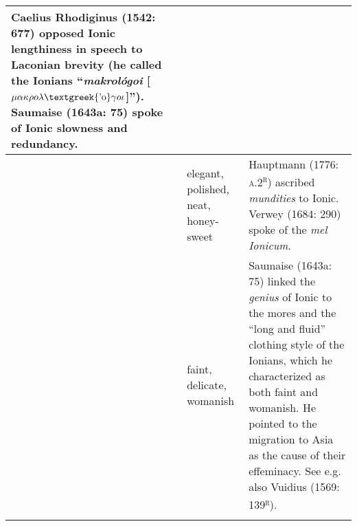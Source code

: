 \begin{flushleft}
\begin{supertabular}{m{0.5976598in}|m{1.4962599in}|m{3.9233599in}|}
Caelius Rhodiginus (1542: 677) opposed Ionic lengthiness in speech to Laconian brevity (he called the Ionians “\textit{makrológoi} [$\mu \alpha \kappa \rho o\lambda \text{\textgreek{'o}}\gamma o\iota $]”). Saumaise (1643a: 75) spoke of Ionic slowness and redundancy.\\\hline
 &
elegant, polished, neat, honey-sweet &
Hauptmann (1776: \textsc{a.2}\textsc{\textsuperscript{r}}) ascribed \textit{mundities} to Ionic. Verwey (1684: 290) spoke of the \textit{mel Ionicum}.\\\hhline{~--}
 &
faint, delicate, womanish &
Saumaise (1643a: 75) linked the \textit{genius} of Ionic to the mores and the “long and fluid” clothing style of the Ionians, which he characterized as both faint and womanish. He pointed to the migration to Asia as the cause of their effeminacy. See e.g. also Vuidius (1569: 139\textsc{\textsuperscript{r}}).\\\hhline{~--}
\end{supertabular}
\end{flushleft}
